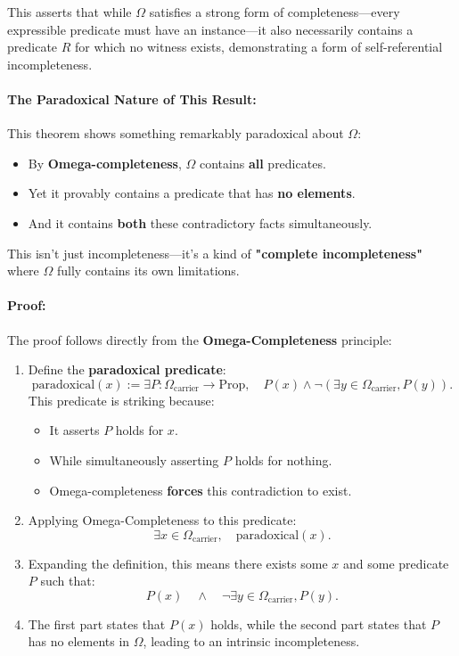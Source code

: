 \documentclass[12pt]{article}
\begin{document}
This asserts that while \( \Omega \) satisfies a strong form of completeness—every expressible predicate must have an instance—it also necessarily contains a predicate \( R \) for which no witness exists, demonstrating a form of self-referential incompleteness.

\paragraph{The Paradoxical Nature of This Result:}
This theorem shows something remarkably paradoxical about \( \Omega \):

\begin{itemize}
    \item By \textbf{Omega-completeness}, \( \Omega \) contains \textbf{all} predicates.
    \item Yet it provably contains a predicate that has \textbf{no elements}.
    \item And it contains \textbf{both} these contradictory facts simultaneously.
\end{itemize}

This isn't just incompleteness—it's a kind of \textbf{"complete incompleteness"} where \( \Omega \) fully contains its own limitations.

\paragraph{Proof:}
The proof follows directly from the \textbf{Omega-Completeness} principle:

\begin{enumerate}
    \item Define the \textbf{paradoxical predicate}:
    \[
    \text{paradoxical}(x) := \exists P: \Omega_{\text{carrier}} \to \text{Prop}, \quad P(x) \wedge \neg (\exists y \in \Omega_{\text{carrier}}, P(y)).
    \]
    This predicate is striking because:
    \begin{itemize}
        \item It asserts \( P \) holds for \( x \).
        \item While simultaneously asserting \( P \) holds for nothing.
        \item Omega-completeness \textbf{forces} this contradiction to exist.
    \end{itemize}
    \item Applying Omega-Completeness to this predicate:
    \[
    \exists x \in \Omega_{\text{carrier}}, \quad \text{paradoxical}(x).
    \]
    \item Expanding the definition, this means there exists some \( x \) and some predicate \( P \) such that:
    \[
    P(x) \quad \wedge \quad \neg \exists y \in \Omega_{\text{carrier}}, P(y).
    \]
    \item The first part states that \( P(x) \) holds, while the second part states that \( P \) has no elements in \( \Omega \), leading to an intrinsic incompleteness.
\end{enumerate}
\end{document}
